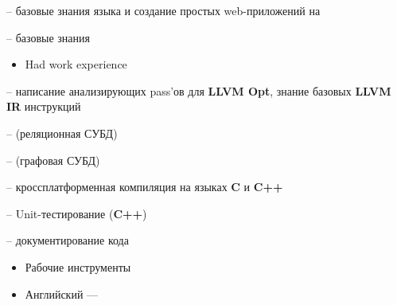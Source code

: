 \documentclass[10pt,a4paper,ragged2e,withhyper]{custom-altacv}
\begin{document}
\begin{paracol}{2}
 -- базовые знания языка и создание простых web-приложений на 

 -- базовые знания
\vspace{.5ex}

\divider

\begin{itemize}
	\item \textcolor{emphasis}{Had work experience} 
\end{itemize}

 -- написание анализирующих pass'ов для \textbf{LLVM Opt}, знание базовых \textbf{LLVM IR} инструкций
\vspace{1ex}

 --  (реляционная СУБД)
\vspace{-.2ex}

 --  (графовая СУБД)
\vspace{1ex}

 -- кроссплатформенная компиляция на языках \textbf{C} и \textbf{C++}
\vspace{1ex}

 -- Unit-тестирование (\textbf{C++})
\vspace{1ex}

 -- документирование кода
\vspace{1ex}

\vspace{1ex}

\divider

\begin{itemize}
	\item\textcolor{emphasis}{Рабочие инструменты}
\end{itemize}





\begin{itemize}
	\item Английский --- 
\end{itemize}

\end{paracol}
\end{document}
